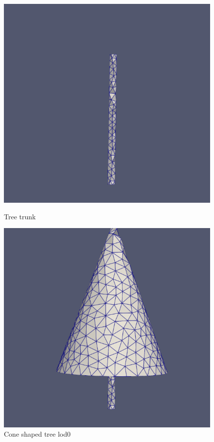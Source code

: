\documentclass[12pt]{article}
\begin{document}
\begin{figure}[H]
    \centering
    \begin{minipage}{0.45\textwidth}
        \centering
        \includegraphics[width=1\textwidth]{images/tree-trunk.png}
        \caption{Tree trunk}
    \end{minipage}
    \begin{minipage}{0.45\textwidth}
        \centering
        \includegraphics[width=1\textwidth]{images/tree-cone_lod0.png}
        \caption{Cone shaped tree lod0}
    \end{minipage}
\end{figure}
\end{document}
